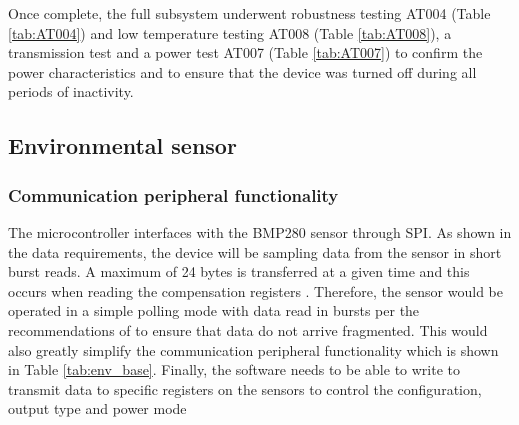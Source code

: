 Once complete, the full subsystem underwent robustness testing AT004 (Table \ref{tab:AT004}) and low temperature testing AT008 (Table \ref{tab:AT008}), a transmission test and a power test  AT007 (Table \ref{tab:AT007}) to confirm the power characteristics and to ensure that the device was turned off during all periods of inactivity.

\subsection{Environmental sensor}
\subsubsection{Communication peripheral functionality}

The microcontroller interfaces with the BMP280 sensor through SPI. As shown in the data requirements, the device will be sampling data from the sensor in short burst reads. A maximum of 24 bytes is transferred at a given time and this occurs when reading the compensation registers \cite{BMP280_Datasheet}. Therefore, the sensor would be operated in a simple polling mode with data read in bursts per the recommendations of \textcite{BMP280_Datasheet} to ensure that data do not arrive fragmented. This would also greatly simplify the communication peripheral functionality which is shown in Table \ref{tab:env_base}. Finally, the software needs to be able to write to transmit data to specific registers on the sensors to control the configuration, output type and power mode

\begin{table}[H]
	\centering
	\caption{Baseline functionality of the BMP280 SPI communication peripheral of the firmware and the tests used to verify unit functionality.}
	\label{tab:env_base}
	\setlength{\extrarowheight}{5pt}
\end{table}

